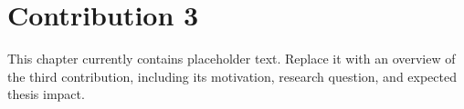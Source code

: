 \chapter{Contribution 3}
\label{ch::Contribution3}

This chapter currently contains placeholder text. Replace it with an overview of the third contribution, including its motivation, research question, and expected thesis impact.
